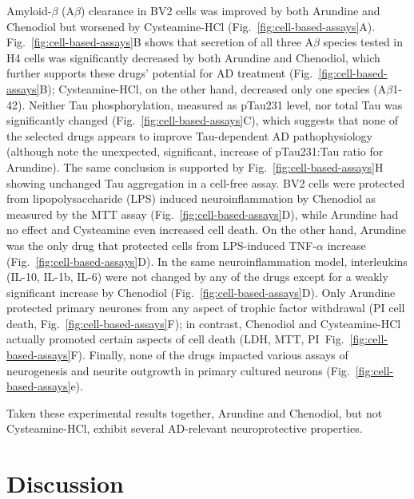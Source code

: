 \documentclass[letterpaper]{article}
\begin{document}
Amyloid-$\beta$
(A$\beta$) clearance in BV2 cells was improved by both Arundine and Chenodiol
but worsened by Cysteamine-HCl (Fig.~\ref{fig:cell-based-assays}A).
Fig.~\ref{fig:cell-based-assays}B shows that secretion of all three A$\beta$
species tested in H4 cells was significantly decreased by both Arundine and
Chenodiol, which further supports these drugs' potential for AD treatment
(Fig.~\ref{fig:cell-based-assays}B); Cysteamine-HCl, on the other hand,
decreased only one species (A$\beta$1-42).  Neither Tau phosphorylation,
measured as pTau231 level, nor total Tau was significantly changed
(Fig.~\ref{fig:cell-based-assays}C), which suggests that none of the selected
drugs appears to improve Tau-dependent AD pathophysiology (although note the
unexpected, significant, increase of pTau231:Tau ratio for Arundine).  The
same conclusion is supported by Fig.~\ref{fig:cell-based-assays}H showing
unchanged Tau aggregation in a cell-free assay. BV2 cells were protected from
lipopolysaccharide (LPS) induced neuroinflammation by Chenodiol as measured by
the MTT assay (Fig.~\ref{fig:cell-based-assays}D), while Arundine had no
effect and Cysteamine even increased cell death.  On the other hand, Arundine
was the only drug that protected cells from LPS-induced TNF-$\alpha$ increase
(Fig.~\ref{fig:cell-based-assays}D).  In the same neuroinflammation model,
interleukins (IL-10, IL-1b, IL-6) were not changed by any of the drugs except
for a weakly significant increase by Chenodiol
(Fig.~\ref{fig:cell-based-assays}D).  Only Arundine protected primary neurones
from any aspect of trophic factor withdrawal (PI cell death,
Fig.~\ref{fig:cell-based-assays}F); in contrast, Chenodiol and Cysteamine-HCl
actually promoted certain aspects of cell death (LDH, MTT,
PI~Fig.~\ref{fig:cell-based-assays}F).  Finally, none of the drugs impacted
various assays of neurogenesis and neurite outgrowth in primary cultured
neurons (Fig.~\ref{fig:cell-based-assays}e).

Taken these experimental results together, Arundine and Chenodiol, but not
Cysteamine-HCl, exhibit several AD-relevant neuroprotective properties.

\section{Discussion}
\end{document}
